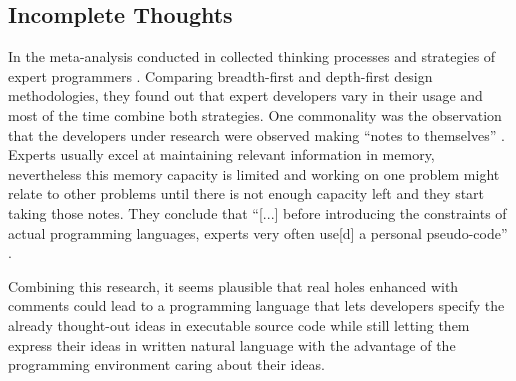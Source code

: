 \subsection{Incomplete Thoughts}
\label{sub:incomplete-thoughts}
In the meta-analysis  \citeauthor{visser_expert_1990} conducted in \citeyear{visser_expert_1990} collected thinking processes and strategies of expert programmers \autocite{visser_expert_1990}.
Comparing breadth-first and depth-first design methodologies, they found out that expert developers vary in their usage and most of the time combine both strategies.
One commonality was the observation that the developers under research were observed making ``notes to themselves'' \autocite[241]{visser_expert_1990}.
Experts usually excel at maintaining relevant information in memory, nevertheless this memory capacity is limited and working on one problem might relate to other problems until there is not enough capacity left and they start taking those notes.
They conclude that ``[...] before introducing the constraints of actual programming languages, experts very often use[d] a personal pseudo-code'' \autocite[242]{visser_expert_1990}.

Combining this research, it seems plausible that real holes enhanced with comments could lead to a programming language that lets developers specify the already thought-out ideas in executable source code while still letting them express their ideas in written natural language with the advantage of the programming environment caring about their ideas.


